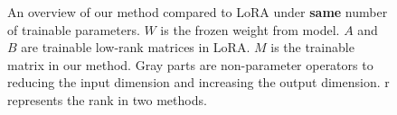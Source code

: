 \documentclass[11pt]{article}
\begin{document}
\begin{figure}[t]
    \centering

    \caption{
      An overview of our method compared to LoRA under \textbf{same} number of trainable parameters.
    $W$ is the frozen weight from model. $A$ and $B$ are trainable low-rank matrices in LoRA.
      $M$ is the trainable matrix in our method.
      Gray parts are non-parameter operators to reducing the input dimension and increasing the output dimension.
      \textcolor{rankcolor}{r} represents the rank in two methods.
      }
    \label{fig:framework}
\end{figure}
\end{document}
